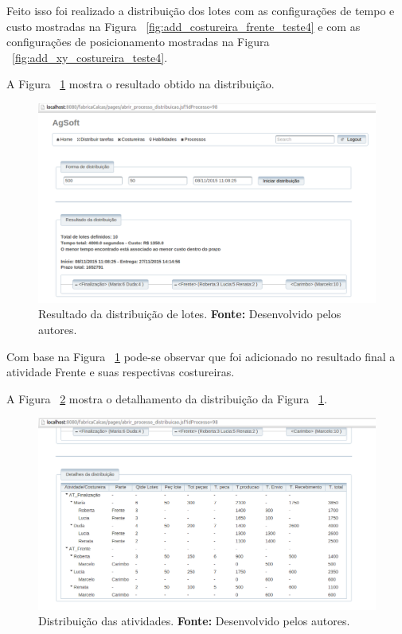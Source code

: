 \par Feito isso foi realizado a distribuição dos lotes com as configurações de
tempo e custo mostradas na Figura ~\ref{fig:add_costureira_frente_teste4} e com
as configurações de posicionamento mostradas na Figura
~\ref{fig:add_xy_costureira_teste4}.
\par A Figura ~\ref{fig:resultado1_teste5} mostra o resultado obtido na
distribuição.



\begin{figure}[h!]
	\centerline{\includegraphics[scale=0.3]{./imagens/resultado1_teste5.png}}
	\caption[Resultado da distribuição de lotes.]
	{Resultado da distribuição de lotes. \textbf{Fonte:} Desenvolvido pelos
	autores.}
	\label{fig:resultado1_teste5}
\end{figure}

\par Com base na Figura ~\ref{fig:resultado1_teste5} pode-se observar que foi
adicionado no resultado final a atividade Frente e suas respectivas costureiras.

\par A Figura ~\ref{fig:detalhamento1_teste5} mostra o detalhamento da
distribuição da Figura ~\ref{fig:resultado1_teste5}.

\newpage

\begin{figure}[h!]
	\centerline{\includegraphics[scale=0.3]{./imagens/detalhamento1_teste5.png}}
	\caption[Distribuição das atividades.]
	{Distribuição das atividades. \textbf{Fonte:} Desenvolvido pelos
	autores.}
	\label{fig:detalhamento1_teste5}
\end{figure}

